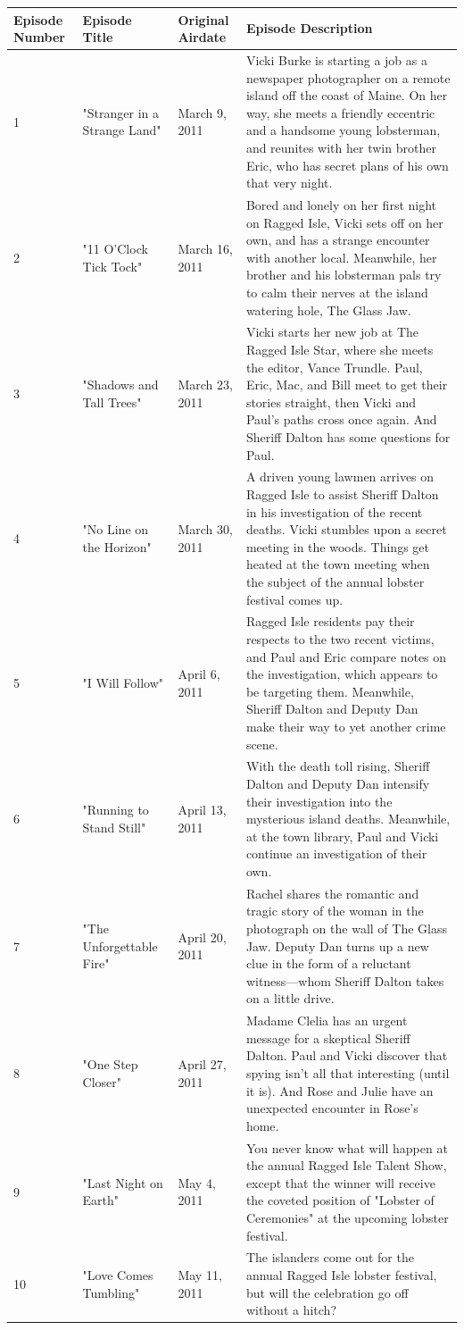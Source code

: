 \documentclass{article}
\begin{document}
\begin{tabular}{llll}
\toprule
Episode Number & Episode Title & Original Airdate & Episode Description \\
\midrule
1 & "Stranger in a Strange Land" & March 9, 2011 & Vicki Burke is starting a job as a newspaper photographer on a remote island off the coast of Maine. On her way, she meets a friendly eccentric and a handsome young lobsterman, and reunites with her twin brother Eric, who has secret plans of his own that very night. \\
2 & "11 O'Clock Tick Tock" & March 16, 2011 & Bored and lonely on her first night on Ragged Isle, Vicki sets off on her own, and has a strange encounter with another local. Meanwhile, her brother and his lobsterman pals try to calm their nerves at the island watering hole, The Glass Jaw. \\
3 & "Shadows and Tall Trees" & March 23, 2011 & Vicki starts her new job at The Ragged Isle Star, where she meets the editor, Vance Trundle. Paul, Eric, Mac, and Bill meet to get their stories straight, then Vicki and Paul's paths cross once again. And Sheriff Dalton has some questions for Paul. \\
4 & "No Line on the Horizon" & March 30, 2011 & A driven young lawmen arrives on Ragged Isle to assist Sheriff Dalton in his investigation of the recent deaths. Vicki stumbles upon a secret meeting in the woods. Things get heated at the town meeting when the subject of the annual lobster festival comes up. \\
5 & "I Will Follow" & April 6, 2011 & Ragged Isle residents pay their respects to the two recent victims, and Paul and Eric compare notes on the investigation, which appears to be targeting them. Meanwhile, Sheriff Dalton and Deputy Dan make their way to yet another crime scene. \\
6 & "Running to Stand Still" & April 13, 2011 & With the death toll rising, Sheriff Dalton and Deputy Dan intensify their investigation into the mysterious island deaths. Meanwhile, at the town library, Paul and Vicki continue an investigation of their own. \\
7 & "The Unforgettable Fire" & April 20, 2011 & Rachel shares the romantic and tragic story of the woman in the photograph on the wall of The Glass Jaw. Deputy Dan turns up a new clue in the form of a reluctant witness—whom Sheriff Dalton takes on a little drive. \\
8 & "One Step Closer" & April 27, 2011 & Madame Clelia has an urgent message for a skeptical Sheriff Dalton. Paul and Vicki discover that spying isn't all that interesting (until it is). And Rose and Julie have an unexpected encounter in Rose's home. \\
9 & "Last Night on Earth" & May 4, 2011 & You never know what will happen at the annual Ragged Isle Talent Show, except that the winner will receive the coveted position of "Lobster of Ceremonies" at the upcoming lobster festival. \\
10 & "Love Comes Tumbling" & May 11, 2011 & The islanders come out for the annual Ragged Isle lobster festival, but will the celebration go off without a hitch? \\
\bottomrule
\end{tabular}
\end{document}
